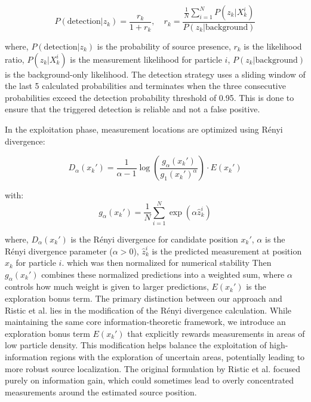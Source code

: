 \documentclass[../report.tex]{subfiles}
\begin{document}
    \begin{equation}
    P(\text{detection}|z_k) = \frac{r_k}{1 + r_k}, \quad r_k = \frac{\frac{1}{N}\sum_{i=1}^N P(z_k|X_k^i)}{P(z_k|\text{background})}
    \label{eq:prob_detection}
    \end{equation}

    where, $P(\text{detection}|z_k)$ is the probability of source presence, $r_k$ is the likelihood ratio, $P(z_k|X_k^i)$ is the measurement likelihood for particle $i$, $P(z_k|\text{background})$ 
    is the background-only likelihood. The detection strategy uses a sliding window of the last 5 calculated probabilities and terminates when the three consecutive probabilities exceed the detection
    probability threshold of 0.95. This is done to ensure that the triggered detection is reliable and not a false positive.

    In the exploitation phase, measurement locations are optimized using Rényi divergence:

    \begin{equation}
    D_\alpha(x_k') = \frac{1}{\alpha-1} \log\left(\frac{g_\alpha(x_k')}{g_1(x_k')^\alpha}\right) \cdot E(x_k')
    \end{equation}

    with:
    \begin{equation}
    g_\alpha(x_k') = \frac{1}{N}\sum_{i=1}^N \exp(\alpha \hat{z}_k^i)
    \end{equation}

    where, $D_\alpha(x_k')$ is the Rényi divergence for candidate position $x_k'$, $\alpha$ is the Rényi divergence parameter ($\alpha > 0$), $\hat{z}_k^i$ is the predicted measurement at position $x_k$ for particle $i$. which was then normalized for numerical stability Then $g_\alpha(x_k')$ combines these normalized predictions 
    into a weighted sum, where $\alpha$ controls how much weight is given to larger predictions, $E(x_k')$ is the exploration bonus term. The primary distinction between our approach and Ristic et al. 
    \cite{ristic2010information}
    lies in the modification of the Rényi divergence calculation. While maintaining the same core information-theoretic framework, we introduce an exploration bonus term $E(x_k')$ that explicitly 
    rewards measurements in areas of low particle density. This modification helps balance the exploitation of high-information regions with the exploration of uncertain areas, potentially leading 
    to more robust source localization. The original formulation by Ristic et al. focused purely on information gain, which could sometimes lead to overly concentrated measurements around the 
    estimated source position.
\end{document}
